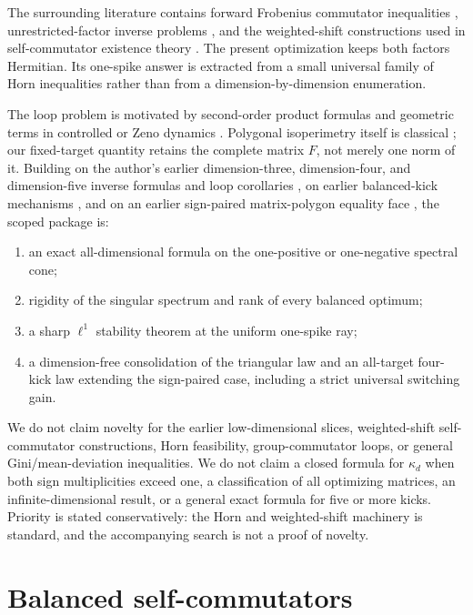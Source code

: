 \documentclass[11pt]{article}
\theoremstyle{definition}
\theoremstyle{remark}
\newcommand{\1}{\mathbf 1}
\begin{document}
The surrounding literature contains forward Frobenius commutator
inequalities \cite{bottcher2005,bottcher2008,cheng2010}, unrestricted-factor
inverse problems \cite{weiss1980}, and the weighted-shift constructions used
in self-commutator existence theory \cite{fan1980,beltita2014}.  The present
optimization keeps both factors Hermitian.  Its one-spike answer is extracted
from a small universal family of Horn inequalities rather than from a
dimension-by-dimension enumeration.

The loop problem is motivated by second-order product formulas and geometric
terms in controlled or Zeno dynamics \cite{burgarth2013,chen2022}.  Polygonal
isoperimetry itself is classical \cite{indrei2015}; our fixed-target quantity
retains the complete matrix $F$, not merely one norm of it.  Building on the
author's earlier dimension-three, dimension-four, and dimension-five inverse
formulas and loop corollaries \cite{erikssonQutrit,erikssonFour,erikssonFive},
on earlier balanced-kick mechanisms \cite{erikssonOperational}, and on an
earlier sign-paired matrix-polygon equality face
\cite{erikssonIsoperimetry}, the scoped package is:
\begin{enumerate}[label=(\roman*),leftmargin=2.2em]
 \item an exact all-dimensional formula on the one-positive or one-negative
 spectral cone;
 \item rigidity of the singular spectrum and rank of every balanced optimum;
 \item a sharp $\ell^1$ stability theorem at the uniform one-spike ray;
 \item a dimension-free consolidation of the triangular law and an all-target
 four-kick law extending the sign-paired case, including a strict universal
 switching gain.
\end{enumerate}
We do not claim novelty for the earlier low-dimensional slices, weighted-shift
self-commutator constructions, Horn feasibility, group-commutator loops, or
general Gini/mean-deviation inequalities.  We do not claim a closed formula for $\kappa_d$ when both sign multiplicities
exceed one, a classification of all optimizing matrices, an
infinite-dimensional result, or a general exact formula for five or more
kicks.  Priority is stated conservatively: the Horn and weighted-shift
machinery is standard, and the accompanying search is not a proof of novelty.

\section{Balanced self-commutators}
\end{document}
